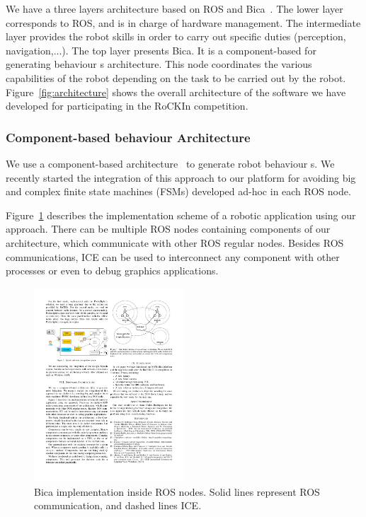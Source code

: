 \documentclass[conference]{IEEEtran}
\begin{document}
We have a three layers architecture based on ROS and Bica~\cite{aguero2010behavior}. 
The lower layer corresponds to ROS, and is in charge of hardware management. 
The intermediate layer provides the robot skills in order to carry out specific duties (perception, navigation,...).
The top layer presents Bica. It is a component-based for generating behaviour s architecture. This node coordinates the various
capabilities of the robot depending on the task to be carried out by the robot.
Figure~\ref{fig:architecture} shows the overall architecture of the software we have developed for participating in the RoCKIn competition. 







\subsubsection{Component-based behaviour  Architecture}

We use a component-based architecture~\cite{aguero2010behavior} to generate robot behaviour s. We recently
started the integration of this approach to our platform for avoiding big and complex finite
state machines (FSMs) developed ad-hoc in each ROS node. 

Figure~\ref{fig:BicaandROS} describes the implementation scheme of a robotic application using our approach.
There can be multiple ROS nodes containing components of our architecture, which communicate
with other ROS regular nodes. Besides ROS communications, ICE can be used to
interconnect any component with other processes or even to debug graphics applications.



\begin{figure}[ht!]
  \centering
  \includegraphics[width=0.5\textwidth]{50}
  \caption{Bica implementation inside ROS nodes. Solid lines represent ROS communication, and dashed lines ICE.} 
  \label{fig:BicaandROS}
\end{figure}
\end{document}
